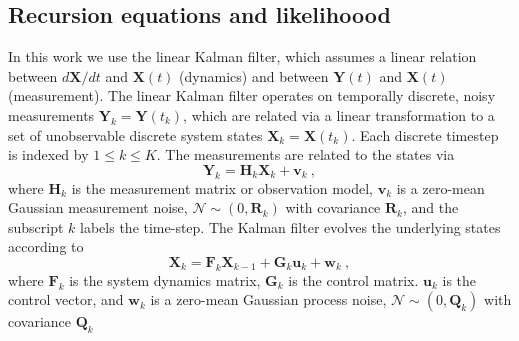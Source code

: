 \documentclass[fleqn,usenatbib,useAMS]{mnras}
\begin{document}
%

\subsection{Recursion equations and likelihoood }\label{sec_kalman_general}
In this work we use the linear Kalman filter, which assumes a linear relation between $d{\boldsymbol{X}}/dt$ and ${\boldsymbol{X}}(t)$ (dynamics) and between ${\boldsymbol{Y}}(t)$ and ${\boldsymbol{X}}(t)$ (measurement). The linear Kalman filter operates on temporally discrete, noisy measurements $\boldsymbol{Y}_k = \boldsymbol{Y}(t_k)$, which are related via a linear transformation to a set of unobservable discrete system states $\boldsymbol{X}_k= \boldsymbol{X}(t_k)$. Each discrete timestep is indexed by $ 1 \leq k  \leq K$. The measurements are related to the states via
\begin{equation}
	\boldsymbol{Y}_k = \boldsymbol{H}_k \boldsymbol{X}_k + \boldsymbol{v}_k \ ,\label{eq:kalman1}
\end{equation}
where $\boldsymbol{H}_k$ is the measurement matrix or observation model, $\boldsymbol{v}_k$ is a zero-mean Gaussian measurement noise, $\mathcal{N} \sim (0,\boldsymbol{R}_k)$ with covariance $\boldsymbol{R}_k$, and the subscript $k$ labels the time-step. The Kalman filter evolves the underlying states according to
\begin{equation}
	\boldsymbol{X}_k = \boldsymbol{F}_k \boldsymbol{X}_{k-1} + \boldsymbol{G}_k \boldsymbol{u}_k + \boldsymbol{w}_k \ , \label{eq:kalman2}
\end{equation}
where $\boldsymbol{F}_k$ is the system dynamics matrix, $\boldsymbol{G}_k$ is the control matrix. $\boldsymbol{u}_k$ is the control vector, and $\boldsymbol{w}_k$ is a zero-mean Gaussian process noise, $\mathcal{N} \sim (0,\boldsymbol{Q}_k)$ with covariance $\boldsymbol{Q}_k$ \newline 
\end{document}
